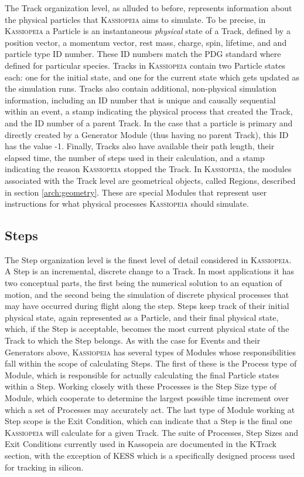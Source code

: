 The Track organization level, as alluded to before, represents information about the physical particles that \textsc{Kassiopeia} aims to simulate.  To be precise, in \textsc{Kassiopeia} a Particle is an instantaneous \emph{physical} state of a Track, defined by a position vector, a momentum vector, rest mass, charge, spin, lifetime, and and particle type ID number.  These ID numbers match the PDG standard where defined for particular species.  Tracks in \textsc{Kassiopeia} contain two Particle states each: one for the initial state, and one for the current state which gets updated as the simulation runs.  Tracks also contain additional, non-physical simulation information, including an ID number that is unique and causally sequential within an event, a stamp indicating the physical process that created the Track, and the ID number of a parent Track.  In the case that a particle is primary and directly created by a Generator Module (thus having no parent Track), this ID has the value -1.  Finally, Tracks also have available their path length, their elapsed time, the number of steps used in their calculation, and a stamp indicating the reason \textsc{Kassiopeia} stopped the Track.  In \textsc{Kassiopeia}, the modules associated with the Track level are geometrical objects, called Regions, described in section \ref{arch:geometry}.  These are special Modules that represent user instructions for what physical processes \textsc{Kassiopeia} should simulate.

\subsection{Steps}
\label{arch:steps}

The Step organization level is the finest level of detail considered in \textsc{Kassiopeia}.  A Step is an incremental, discrete change to a Track.  In most applications it has two conceptual parts, the first being the numerical solution to an equation of motion, and the second being the simulation of discrete physical processes that may have occurred during flight along the step.  Steps keep track of their initial physical state, again represented as a Particle, and their final physical state, which, if the Step is acceptable, becomes the most current physical state of the Track to which the Step belongs.  As with the case for Events and their Generators above, \textsc{Kassiopeia} has several types of Modules whose responsibilities fall within the scope of calculating Steps.  The first of these is the Process type of Module, which is responsible for actually calculating the final Particle states within a Step.  Working closely with these Processes is the Step Size type of Module, which cooperate to determine the largest possible time increment over which a set of Processes may accurately act.  The last type of Module working at Step scope is the Exit Condition, which can indicate that a Step is the final one \textsc{Kassiopeia} will calculate for a given Track.  The suite of Processes, Step Sizes and Exit Conditions currently used in Kassopeia are documented in the KTrack section, with the exception of KESS which is a specifically designed process used for tracking in silicon.

